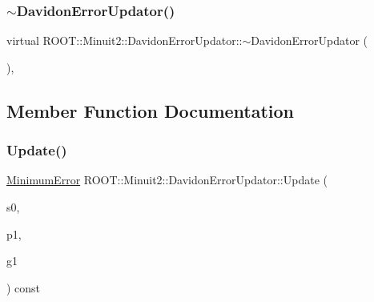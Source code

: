 \mbox{\label{classROOT_1_1Minuit2_1_1DavidonErrorUpdator_a3308df97623b7a93a33d1146e8182fc5}} 
\subsubsection{\texorpdfstring{$\sim$DavidonErrorUpdator()}{~DavidonErrorUpdator()}\hspace{0.1cm}{\footnotesize\ttfamily [2/2]}}
{\footnotesize\ttfamily virtual R\+O\+O\+T\+::\+Minuit2\+::\+Davidon\+Error\+Updator\+::$\sim$\+Davidon\+Error\+Updator (\begin{DoxyParamCaption}{ }\end{DoxyParamCaption})\hspace{0.3cm}{\ttfamily [inline]}, {\ttfamily [virtual]}}



\subsection{Member Function Documentation}
\mbox{\label{classROOT_1_1Minuit2_1_1DavidonErrorUpdator_afad671aa523cbd9f17af376c51c3ce97}} 
\subsubsection{\texorpdfstring{Update()}{Update()}\hspace{0.1cm}{\footnotesize\ttfamily [1/2]}}
{\footnotesize\ttfamily \mbox{\hyperlink{classROOT_1_1Minuit2_1_1MinimumError}{Minimum\+Error}} R\+O\+O\+T\+::\+Minuit2\+::\+Davidon\+Error\+Updator\+::\+Update (\begin{DoxyParamCaption}\item[{const \mbox{\hyperlink{classROOT_1_1Minuit2_1_1MinimumState}{Minimum\+State}} \&}]{s0,  }\item[{const \mbox{\hyperlink{classROOT_1_1Minuit2_1_1MinimumParameters}{Minimum\+Parameters}} \&}]{p1,  }\item[{const \mbox{\hyperlink{classROOT_1_1Minuit2_1_1FunctionGradient}{Function\+Gradient}} \&}]{g1 }\end{DoxyParamCaption}) const\hspace{0.3cm}{\ttfamily [virtual]}}



